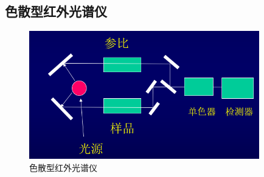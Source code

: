 \subsection{色散型红外光谱仪}
\begin{figure}[ht]
	\centering
	\includegraphics[width=10cm]{image/chp5_ord_ins.png}
	\caption{色散型红外光谱仪}
	\label{fig:ordin_ins}
\end{figure}
